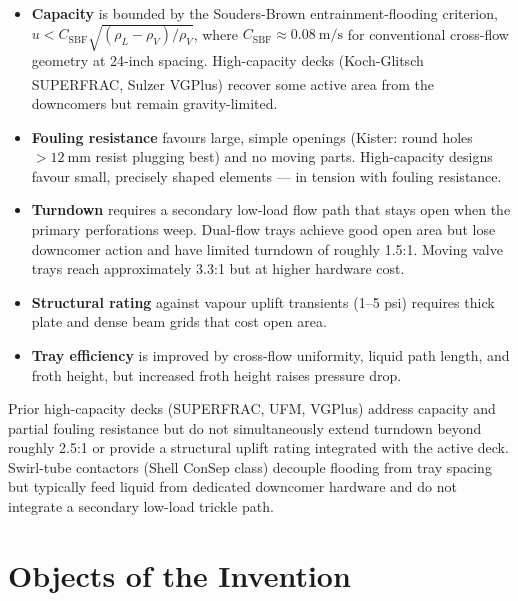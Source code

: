 \documentclass[11pt,letterpaper]{article}
\newcommand{\Csb}{C_{\mathrm{SBF}}}
\begin{document}
\begin{itemize}[nosep]
  \item \textbf{Capacity} is bounded by the Souders-Brown entrainment-flooding
    criterion, $u < \Csb\sqrt{(\rho_L-\rho_V)/\rho_V}$, where
    $\Csb\approx\SI{0.08}{\metre\per\second}$ for conventional cross-flow
    geometry at 24-inch spacing.  High-capacity decks
    (Koch-Glitsch SUPERFRAC\textsuperscript{\textregistered},
    Sulzer VGPlus) recover some active area from the downcomers but remain
    gravity-limited.

  \item \textbf{Fouling resistance} favours large, simple openings (Kister:
    round holes $>\SI{12}{\milli\metre}$ resist plugging best) and no
    moving parts.  High-capacity designs favour small, precisely shaped
    elements --- in tension with fouling resistance.

  \item \textbf{Turndown} requires a secondary low-load flow path that
    stays open when the primary perforations weep.  Dual-flow trays
    achieve good open area but lose downcomer action and have limited
    turndown of roughly 1.5:1.  Moving valve trays reach approximately
    3.3:1 but at higher hardware cost.

  \item \textbf{Structural rating} against vapour uplift transients (1--5 psi)
    requires thick plate and dense beam grids that cost open area.

  \item \textbf{Tray efficiency} is improved by cross-flow uniformity, liquid
    path length, and froth height, but increased froth height raises pressure
    drop.
\end{itemize}

Prior high-capacity decks (SUPERFRAC, UFM, VGPlus) address capacity and
partial fouling resistance but do not simultaneously extend turndown beyond
roughly 2.5:1 or provide a structural uplift rating integrated with the
active deck.  Swirl-tube contactors (Shell ConSep class) decouple flooding
from tray spacing but typically feed liquid from dedicated downcomer hardware
and do not integrate a secondary low-load trickle path.

\section{Objects of the Invention}
\end{document}
